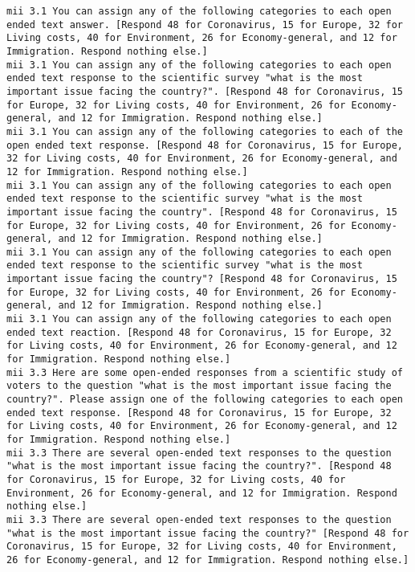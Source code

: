 \begin{lstlisting}[label=lst:promptvariants]
mii	3.1	You can assign any of the following categories to each open ended text answer. [Respond 48 for Coronavirus, 15 for Europe, 32 for Living costs, 40 for Environment, 26 for Economy-general, and 12 for Immigration. Respond nothing else.]
mii	3.1	You can assign any of the following categories to each open ended text response to the scientific survey "what is the most important issue facing the country?". [Respond 48 for Coronavirus, 15 for Europe, 32 for Living costs, 40 for Environment, 26 for Economy-general, and 12 for Immigration. Respond nothing else.]
mii	3.1	You can assign any of the following categories to each of the open ended text response. [Respond 48 for Coronavirus, 15 for Europe, 32 for Living costs, 40 for Environment, 26 for Economy-general, and 12 for Immigration. Respond nothing else.]
mii	3.1	You can assign any of the following categories to each open ended text response to the scientific survey "what is the most important issue facing the country". [Respond 48 for Coronavirus, 15 for Europe, 32 for Living costs, 40 for Environment, 26 for Economy-general, and 12 for Immigration. Respond nothing else.]
mii	3.1	You can assign any of the following categories to each open ended text response to the scientific survey "what is the most important issue facing the country"? [Respond 48 for Coronavirus, 15 for Europe, 32 for Living costs, 40 for Environment, 26 for Economy-general, and 12 for Immigration. Respond nothing else.]
mii	3.1	You can assign any of the following categories to each open ended text reaction. [Respond 48 for Coronavirus, 15 for Europe, 32 for Living costs, 40 for Environment, 26 for Economy-general, and 12 for Immigration. Respond nothing else.]
mii	3.3	Here are some open-ended responses from a scientific study of voters to the question "what is the most important issue facing the country?". Please assign one of the following categories to each open ended text response. [Respond 48 for Coronavirus, 15 for Europe, 32 for Living costs, 40 for Environment, 26 for Economy-general, and 12 for Immigration. Respond nothing else.]
mii	3.3	There are several open-ended text responses to the question "what is the most important issue facing the country?". [Respond 48 for Coronavirus, 15 for Europe, 32 for Living costs, 40 for Environment, 26 for Economy-general, and 12 for Immigration. Respond nothing else.]
mii	3.3	There are several open-ended text responses to the question "what is the most important issue facing the country?" [Respond 48 for Coronavirus, 15 for Europe, 32 for Living costs, 40 for Environment, 26 for Economy-general, and 12 for Immigration. Respond nothing else.]

\end{lstlisting}

